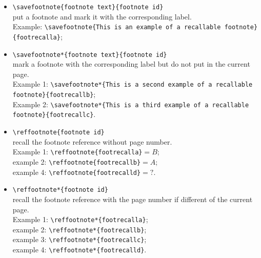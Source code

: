 \documentclass[book,taskpackage,specpackage,codepackage]{upmethodology-document}
\begin{document}
\begin{itemize}
\item \texttt{{\textbackslash}savefootnote\{footnote text\}\{footnote id\}} \\
	put a footnote and mark it with the corresponding label. \\
	Example: \texttt{{\textbackslash}savefootnote\{This is an example of a recallable footnote\}\{footrecalla\}};
\item \texttt{{\textbackslash}savefootnote*\{footnote text\}\{footnote id\}} \\
	mark a footnote with the corresponding label but do not put in the current page. \\
	Example 1: \texttt{{\textbackslash}savefootnote*\{This is a second example of a recallable footnote\}\{footrecallb\}}; \\
	Example 2: \texttt{{\textbackslash}savefootnote*\{This is a third example of a recallable footnote\}\{footrecallc\}}.
\item \texttt{{\textbackslash}reffootnote\{footnote id\}} \\
	recall the footnote reference without page number. \\
	Example 1: \texttt{{\textbackslash}reffootnote\{footrecalla\}}$=B$; \\
	example 2: \texttt{{\textbackslash}reffootnote\{footrecallb\}}$=A$; \\
	example 4: \texttt{{\textbackslash}reffootnote\{footrecalld\}}$=?$.
\item \texttt{{\textbackslash}reffootnote*\{footnote id\}} \\
	recall the footnote reference with the page number if different of the current page. \\
	Example 1: \texttt{{\textbackslash}reffootnote*\{footrecalla\}}; \\
	example 2: \texttt{{\textbackslash}reffootnote*\{footrecallb\}}; \\
	example 3: \texttt{{\textbackslash}reffootnote*\{footrecallc\}}; \\
	example 4: \texttt{{\textbackslash}reffootnote*\{footrecalld\}}.
\end{itemize}
\end{document}
